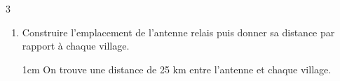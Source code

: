 \documentclass[a4paper]{book}
\begin{document}
{\begin{exerciceNote}{3}
\begin{enumerate}[leftmargin=*]
            \begin{ZoneReponse}{1cm}
                Il faut tracer les médiatrices du triangle
            \end{ZoneReponse}

            \item Construire l'emplacement de l'antenne relais puis donner sa distance par rapport à chaque village.
            
            \begin{ZoneReponse}{1cm}
                On trouve une distance de 25 km entre l'antenne et chaque village.
            \end{ZoneReponse}
        \end{enumerate}
    \end{exerciceNote}

}
\end{document}
